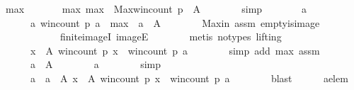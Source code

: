 \begin{isabellebody}
\ max\ \isanewline
\ \ \ \ \ \ max{\isacharcolon}{\kern0pt}\ {\isachardoublequoteopen}max\ {\isacharequal}{\kern0pt}\ Max{\isacharparenleft}{\kern0pt}win{\isacharunderscore}{\kern0pt}count\ p\ {\isacharbackquote}{\kern0pt}\ A{\isacharparenright}{\kern0pt}{\isachardoublequoteclose}\isanewline
\ \ \ \ \ \ \isamarkupfalse%
\ simp\isanewline
\ \ \ \ \isamarkupfalse%
\ \isamarkupfalse%
\ a\ \isanewline
\ \ \ \ \ \ a{\isacharcolon}{\kern0pt}\ {\isachardoublequoteopen}win{\isacharunderscore}{\kern0pt}count\ p\ a\ {\isacharequal}{\kern0pt}\ max\ {\isasymand}\ a\ {\isasymin}\ A{\isachardoublequoteclose}\isanewline
\ \ \ \ \ \ \isamarkupfalse%
\ Max{\isacharunderscore}{\kern0pt}in\ assm{}\ empty{\isacharunderscore}{\kern0pt}is{\isacharunderscore}{\kern0pt}image\isanewline
\ \ \ \ \ \ \ \ \ \ \ \ finite{\isacharunderscore}{\kern0pt}imageI\ imageE\isanewline
\ \ \ \ \ \ \isamarkupfalse%
\ {\isacharparenleft}{\kern0pt}metis\ {\isacharparenleft}{\kern0pt}no{\isacharunderscore}{\kern0pt}types{\isacharcomma}{\kern0pt}\ lifting{\isacharparenright}{\kern0pt}{\isacharparenright}{\kern0pt}\isanewline
\ \ \ \ \isamarkupfalse%
\isanewline
\ \ \ \ \ \ {\isachardoublequoteopen}{\isasymforall}x\ {\isasymin}\ A{\isachardot}{\kern0pt}\ win{\isacharunderscore}{\kern0pt}count\ p\ x\ {\isasymle}\ win{\isacharunderscore}{\kern0pt}count\ p\ a{\isachardoublequoteclose}\isanewline
\ \ \ \ \ \ \isamarkupfalse%
\ {\isacharparenleft}{\kern0pt}simp\ add{\isacharcolon}{\kern0pt}\ max\ assm{}{\isacharparenright}{\kern0pt}\isanewline
\ \ \ \ \isamarkupfalse%
\ \isamarkupfalse%
\isanewline
\ \ \ \ \ \ {\isachardoublequoteopen}a\ {\isasymin}\ A{\isachardoublequoteclose}\isanewline
\ \ \ \ \ \ \isamarkupfalse%
\ a\isanewline
\ \ \ \ \ \ \isamarkupfalse%
\ simp\isanewline
\ \ \ \ \isamarkupfalse%
\ \isamarkupfalse%
\isanewline
\ \ \ \ \ \ {\isachardoublequoteopen}a\ {\isasymin}\ {\isacharbraceleft}{\kern0pt}a\ {\isasymin}\ A{\isachardot}{\kern0pt}\ {\isasymforall}x\ {\isasymin}\ A{\isachardot}{\kern0pt}\ win{\isacharunderscore}{\kern0pt}count\ p\ x\ {\isasymle}\ win{\isacharunderscore}{\kern0pt}count\ p\ a{\isacharbraceright}{\kern0pt}{\isachardoublequoteclose}\isanewline
\ \ \ \ \ \ \isamarkupfalse%
\ blast\isanewline
\ \ \ \ \isamarkupfalse%
\ a{\isacharunderscore}{\kern0pt}elem{\isacharcolon}{\kern0pt}\isanewline

\end{isabellebody}
